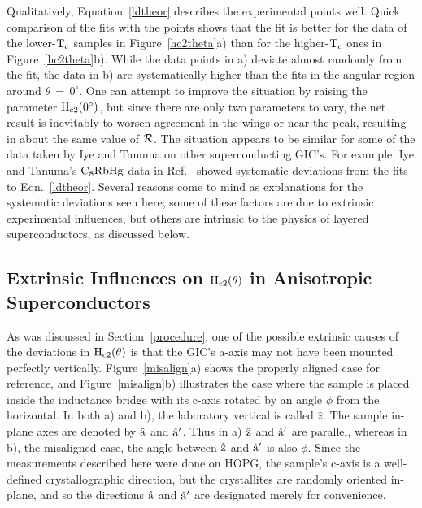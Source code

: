 	Qualitatively,  Equation~\ref{ldtheor} describes  the  experimental
points well.  Quick comparison of the fits with  the  points shows that the
fit is  better   for   the data   of   the  lower-$\rm  T_c$   samples   in
Figure~\ref{hc2theta}a)    than    for the    higher-$\rm  T_c$     ones in
Figure~\ref{hc2theta}b).   While the data   points  in a)   deviate  almost
randomly from the fit,  the data in  b) are systematically  higher than the
fits  in the angular  region around $\theta  \, = \,  0^{\circ}$.   One can
attempt    to  improve   the situation  by    raising  the  parameter  $\rm
H_{c2}(0^{\circ})$, but  since there are only two  parameters  to vary, the
net result is inevitably to worsen agreement in the wings or near the peak,
resulting in about the same value of $\cal R$.  The situation appears to be
similar for   some  of the  data    taken  by  Iye   and  Tanuma on   other
superconducting GIC's.  For example, Iye and Tanuma's $\rm C_8RbHg$ data in
Ref.~\cite{iye82}   showed  systematic   deviations   from  the    fits  to
Eqn.~\ref{ldtheor}.  Several reasons come to  mind as  explanations for the
systematic deviations seen here; some of these factors are due to extrinsic
experimental influences, but others are intrinsic to the physics of layered
superconductors, as discussed below.

\subsection{Extrinsic Influences on $\rm H_{c2}(\theta)$ in Anisotropic
Superconductors}
\label{extrinsic}

	 As was  discussed in  Section~\ref{procedure}, one of the possible
extrinsic causes  of the deviations in  $\rm  H_{c2}(\theta)$  is  that the
GIC's    a-axis  may not     have   been  mounted   perfectly   vertically.
Figure~\ref{misalign}a) shows  the properly aligned  case for  reference, and
Figure~\ref{misalign}b)  illustrates the case  where the  sample  is placed
inside the  inductance bridge with  its c-axis rotated  by an angle  $\phi$
from the horizontal.  In both a) and b), the laboratory  vertical is called
$\hat{z}$.  The  sample in-plane axes  are denoted by $\rm  \hat{a}$  and $\rm
\hat{a}^{\prime}$.  Thus in  a)  $\rm \hat{z}$ and
$\rm \hat{a}^{\prime}$ are parallel, whereas  in  b), the  misaligned case,
the angle between $\rm \hat{z}$  and $\rm \hat{a}^{\prime}$ is also $\phi$.
Since the   measurements  described here were  done  on HOPG, the  sample's
c-axis is  a well-defined crystallographic  direction, but the crystallites
are randomly oriented  in-plane,  and so the  directions $\rm  \hat{a}$ and
$\rm
\hat{a}^{\prime}$ are designated merely for convenience.

